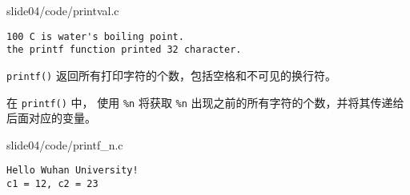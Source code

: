 \begin{frame}[fragile]
  
  {slide04/code/printval.c} \pause 

\begin{lstlisting}[backgroundcolor=\color{red!20}]
100 C is water's boiling point.
the printf function printed 32 character.
\end{lstlisting}

\lstinline|printf()| 返回所有打印字符的个数，包括空格和不可见的换行符。
\end{frame}


\begin{frame}[fragile]
在 \lstinline|printf()| 中， 使用 \lstinline|%n| 将获取 \lstinline|%n| 出现之前的所有字符的个数，并将其传递给后面对应的变量。\pause 


{slide04/code/printf_n.c} \pause 

\begin{lstlisting}[backgroundcolor=\color{red!20}]
Hello Wuhan University!
c1 = 12, c2 = 23
\end{lstlisting}
\end{frame}



